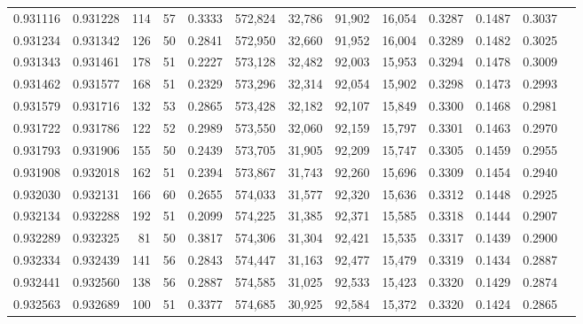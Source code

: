 \begin{tabular}{rrrrrrrrrrrrr}
0.931116 & 0.931228 &   114 &  57 &                                     0.3333 & 572,824 &  32,786 &  91,902 &  16,054 & 0.3287 & 0.1487 & 0.3037 \\
0.931234 & 0.931342 &   126 &  50 &                                     0.2841 & 572,950 &  32,660 &  91,952 &  16,004 & 0.3289 & 0.1482 & 0.3025 \\
0.931343 & 0.931461 &   178 &  51 &                                     0.2227 & 573,128 &  32,482 &  92,003 &  15,953 & 0.3294 & 0.1478 & 0.3009 \\
0.931462 & 0.931577 &   168 &  51 &                                     0.2329 & 573,296 &  32,314 &  92,054 &  15,902 & 0.3298 & 0.1473 & 0.2993 \\
0.931579 & 0.931716 &   132 &  53 &                                     0.2865 & 573,428 &  32,182 &  92,107 &  15,849 & 0.3300 & 0.1468 & 0.2981 \\
0.931722 & 0.931786 &   122 &  52 &                                     0.2989 & 573,550 &  32,060 &  92,159 &  15,797 & 0.3301 & 0.1463 & 0.2970 \\
0.931793 & 0.931906 &   155 &  50 &                                     0.2439 & 573,705 &  31,905 &  92,209 &  15,747 & 0.3305 & 0.1459 & 0.2955 \\
0.931908 & 0.932018 &   162 &  51 &                                     0.2394 & 573,867 &  31,743 &  92,260 &  15,696 & 0.3309 & 0.1454 & 0.2940 \\
0.932030 & 0.932131 &   166 &  60 &                                     0.2655 & 574,033 &  31,577 &  92,320 &  15,636 & 0.3312 & 0.1448 & 0.2925 \\
0.932134 & 0.932288 &   192 &  51 &                                     0.2099 & 574,225 &  31,385 &  92,371 &  15,585 & 0.3318 & 0.1444 & 0.2907 \\
0.932289 & 0.932325 &    81 &  50 &                                     0.3817 & 574,306 &  31,304 &  92,421 &  15,535 & 0.3317 & 0.1439 & 0.2900 \\
0.932334 & 0.932439 &   141 &  56 &                                     0.2843 & 574,447 &  31,163 &  92,477 &  15,479 & 0.3319 & 0.1434 & 0.2887 \\
0.932441 & 0.932560 &   138 &  56 &                                     0.2887 & 574,585 &  31,025 &  92,533 &  15,423 & 0.3320 & 0.1429 & 0.2874 \\
0.932563 & 0.932689 &   100 &  51 &                                     0.3377 & 574,685 &  30,925 &  92,584 &  15,372 & 0.3320 & 0.1424 & 0.2865 \\

\end{tabular}
